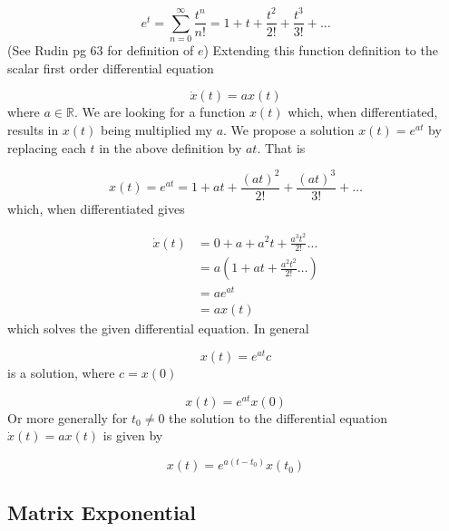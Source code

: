 \begin{equation*}
  e^{t}=\sum\limits_{n=0}^{\infty}\frac{t^{n}}{n!}=
  1+t+\frac{t^{2}}{2!}+\frac{t^{3}}{3!}+\dots
\end{equation*}
(See Rudin pg 63 for definition of $e$) Extending this function definition to the scalar first order differential equation

\begin{equation*}
  \dot{x}(t)=ax(t)
\end{equation*}
where $a \in \mathbb{R}$.
We are looking for a function $x(t)$ which, when differentiated, results in $x(t)$ being multiplied my $a$.
We propose a solution $x(t)=e^{at}$ by replacing each $t$ in the above definition by $at$.
That is

\begin{equation*}
  x(t)=e^{at}=1+at+\frac{(at)^{2}}{2!}+\frac{(at)^{3}}{3!}+\dots
\end{equation*}
which, when differentiated gives

\begin{equation*}
  \begin{split}
    \dot{x}(t)&=0+a+a^{2}t+\frac{a^{3}t^{2}}{2!}\dots \\
    &=a\left(1+at+\frac{a^{2}t^{2}}{2!}\dots \right) \\
    &=ae^{at} \\
    &=ax(t)
  \end{split}
\end{equation*}
which solves the given differential equation.
In general

\begin{equation*}
  x(t)=e^{at}c
\end{equation*}
is a solution, where $c=x(0)$

\begin{equation*}
  x(t)=e^{at}x(0)
\end{equation*}
Or more generally for $t_{0}\neq0$ the solution to the differential equation $\dot{x}(t)=ax(t)$ is given by

\begin{equation*}
  x(t)=e^{a(t-t_{0})}x(t_{0})
\end{equation*}

\subsection{Matrix Exponential}

